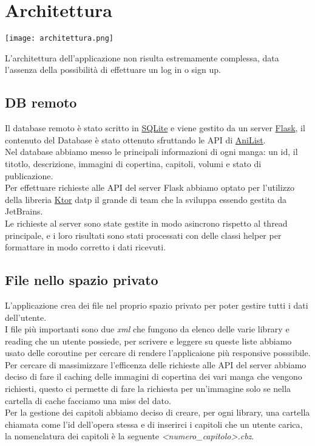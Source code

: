 \documentclass[../Assignment-3-LPSMT.tex]{subfiles}
\begin{document}
\chapter{Architettura}

\begin{center}
  \texttt{[image: architettura.png]}
\end{center}

L'architettura dell'applicazione non risulta estremamente complessa, data l'assenza della possibilità di effettuare un log in o sign up.\\

\section{DB remoto}

Il database remoto è stato scritto in \href{https://www.sqlite.org/index.html}{SQLite} e viene gestito da un server \href{https://flask.palletsprojects.com/en/2.3.x/}{Flask}, il contenuto del Database è stato ottenuto sfruttando le API di \href{https://anilist.gitbook.io/anilist-apiv2-docs/}{AniList}.\\
Nel database abbiamo messo le principali informazioni di ogni manga: un id, il titotlo, descrizione, immagini di copertina, capitoli, volumi e stato di publicazione.\\
Per effettuare richieste alle API del server Flask abbiamo optato per l'utilizzo della libreria \href{https://ktor.io/}{Ktor} datp il grande di team che la sviluppa essendo gestita da JetBrains.\\
Le richieste al server sono state gestite in modo asincrono rispetto al thread principale, e i loro risultati sono stati processati con delle classi helper per formattare in modo corretto i dati ricevuti.\\

\section{File nello spazio privato}

L'applicazione crea dei file nel proprio spazio privato per poter gestire tutti i dati dell'utente.\\
I file più importanti sono due \emph{xml} che fungono da elenco delle varie library e reading che un utente possiede, per scrivere e leggere su queste liste abbiamo usato delle coroutine per cercare di rendere l'applicaione più responsive posssibile.\\
Per cercare di massimizzare l'efficenza delle richieste alle API del server abbiamo deciso di fare il caching delle immagini di copertina dei vari manga che vengono richiesti, questo ci permette di fare la richiesta per un'immagine solo se nella cartella di cache facciamo una miss del dato.\\
Per la gestione dei capitoli abbiamo deciso di creare, per ogni library, una cartella chiamata come l'id dell'opera stessa e di inserirci i capitoli che un utente carica, la nomenclatura dei capitoli è la seguente \emph{<numero\_capitolo>.cbz}.
\end{document}
